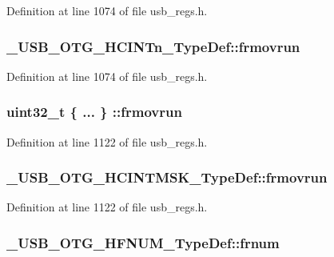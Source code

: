 Definition at line 1074 of file usb\-\_\-regs.\-h.

\hypertarget{group___u_s_b___o_t_g___d_r_i_v_e_r_ga13ee644f45e41eadec5cc5594fe3f99a}{
\subsubsection[{frmovrun}]{ \-\_\-\-U\-S\-B\-\_\-\-O\-T\-G\-\_\-\-H\-C\-I\-N\-Tn\-\_\-\-Type\-Def\-::frmovrun}}\label{group___u_s_b___o_t_g___d_r_i_v_e_r_ga13ee644f45e41eadec5cc5594fe3f99a}


Definition at line 1074 of file usb\-\_\-regs.\-h.

\hypertarget{group___u_s_b___o_t_g___d_r_i_v_e_r_ga520dd2d0275cdc9296a6b6f1a0b3f5df}{
\subsubsection[{frmovrun}]{\setlength{\rightskip}{0pt plus 5cm}uint32\-\_\-t \{ ... \} \-::frmovrun}}\label{group___u_s_b___o_t_g___d_r_i_v_e_r_ga520dd2d0275cdc9296a6b6f1a0b3f5df}


Definition at line 1122 of file usb\-\_\-regs.\-h.

\hypertarget{group___u_s_b___o_t_g___d_r_i_v_e_r_ga951f328c52972f9f8656799576b9f3a0}{
\subsubsection[{frmovrun}]{ \-\_\-\-U\-S\-B\-\_\-\-O\-T\-G\-\_\-\-H\-C\-I\-N\-T\-M\-S\-K\-\_\-\-Type\-Def\-::frmovrun}}\label{group___u_s_b___o_t_g___d_r_i_v_e_r_ga951f328c52972f9f8656799576b9f3a0}


Definition at line 1122 of file usb\-\_\-regs.\-h.

\hypertarget{group___u_s_b___o_t_g___d_r_i_v_e_r_gab61a09b828122eeb28511a7e31f67ec0}{
\subsubsection[{frnum}]{ \-\_\-\-U\-S\-B\-\_\-\-O\-T\-G\-\_\-\-H\-F\-N\-U\-M\-\_\-\-Type\-Def\-::frnum}}\label{group___u_s_b___o_t_g___d_r_i_v_e_r_gab61a09b828122eeb28511a7e31f67ec0}


